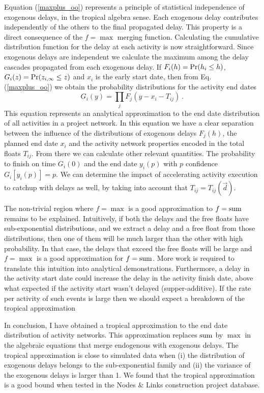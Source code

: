 \documentclass[reprint,aps,prl,amsmath,amssymb,superscriptaddress,showpacs]{revtex4-1}
\begin{document}
Equation (\ref{maxplus_oo}) represents a principle of statistical independence of exogenous delays, in the tropical algebra sense. Each exogenous delay contributes independently of the others to the final propagated delay. This property is a direct consequence of the $f=\max$ merging function. Calculating the cumulative distribution function for the delay at each activity is now straightforward. Since exogenous delays are independent we calculate the maximum among the delay cascades propagated from each exogenous delay.  If $F_i(h)={\rm Pr}(h_i\leq h)$, $G_i(z) = {\rm Pr}(z_{i,\infty}\leq z)$ and $x_i$ is the early start date, then from Eq. (\ref{maxplus_oo}) we obtain the probability distributions for the activity end dates
%
\begin{equation}
G_i(y) = \prod_{j} F_j(y-x_i-T_{ij})\ .
\label{CDF}
\end{equation}
%
This equation represents an analytical approximation to the end date distribution of all activities in a project network. In this equation we have a clear separation between the influence of the distributions of exogenous delays $F_j(h)$, the planned end date $x_i$ and the activity network properties encoded in the total floats $T_{ij}$. From there we can calculate other relevant quantities. The probability to finish on time $G_i(0)$ and the end date $y_i(p)$ with $p$ confidence $G_i[y_i(p)]=p$. We can determine the impact of accelerating activity execution to catchup with delays as well, by taking into account that $T_{ij}=T_{ij}(\vec{d})$.

The non-trivial region where $f=\max$ is a good approximation to $f={\rm sum}$ remains to be explained. Intuitively, if both the delays and the free floats have sub-exponential distributions, and we extract a delay and a free float from those distributions, then one of them will be much larger than the other with high probability. In that case, the delays that exceed the free floats will be large and $f=\max$ is a good approximation for $f={\rm sum}$. More work is required to translate this intuition into analytical demonstrations. Furthermore, a delay in the activity start date could increase the delay in the activity finish date, above what expected if the activity start wasn't delayed (supper-additive). If the rate per activity of such events is large then we should expect a breakdown of the tropical approximation

In conclusion, I have obtained a tropical approximation to the end date distribution of activity networks. This approximation replaces ${\rm sum}$ by $\max$ in the algebraic equations that merge endogenous with exogenous delays. The tropical approximation is close to simulated data when (i) the distribution of exogenous delays belongs to the sub-exponential family and (ii) the variance of the exogenous delays is larger than 1. We found that the tropical approximation is a good bound when tested in the Nodes \& Links construction project database.
\end{document}
